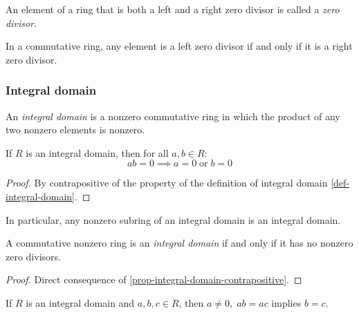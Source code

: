 \documentclass[12pt]{report}
\begin{document}
\begin{definition} \label{def-ring-zero-div}
    An element of a ring that is both a left and a right zero divisor is called a \emph{zero divisor}.
\end{definition}

\begin{remark} \label{rem-ring-commutative-zero-div}
    In a commutative ring, any element is a left zero divisor if and only if it is a right zero divisor.
\end{remark}

\subsubsection{Integral domain}

\begin{definition} \label{def-integral-domain}
    An \emph{integral domain} is a nonzero commutative ring in which the product of any two nonzero elements is nonzero.
\end{definition}

\begin{proposition} \label{prop-integral-domain-contrapositive}
    If $R$ is an integral domain, then for all $a, b \in R$:
    \[
        ab = 0 \implies a = 0 \; \text{or} \; b = 0
    \]
\end{proposition}

\begin{proof}
    By contrapositive of the property of the definition of integral domain \ref{def-integral-domain}.
\end{proof}

\begin{remark}
    In particular, any nonzero subring of an integral domain is an integral domain.
\end{remark}

\begin{proposition} \label{prop-integral-domain-eq}
    A commutative nonzero ring is an \emph{integral domain} if and only if it has no nonzero zero divisors.
\end{proposition}

\begin{proof}
    Direct consequence of \ref{prop-integral-domain-contrapositive}.
\end{proof}

\begin{lemma} \label{lem-ring-cancellation-property}
    If $R$ is an integral domain and $a, b, c \in R$, then $a \neq 0, \; ab = ac$ implies $b = c$.
\end{lemma}
\end{document}
